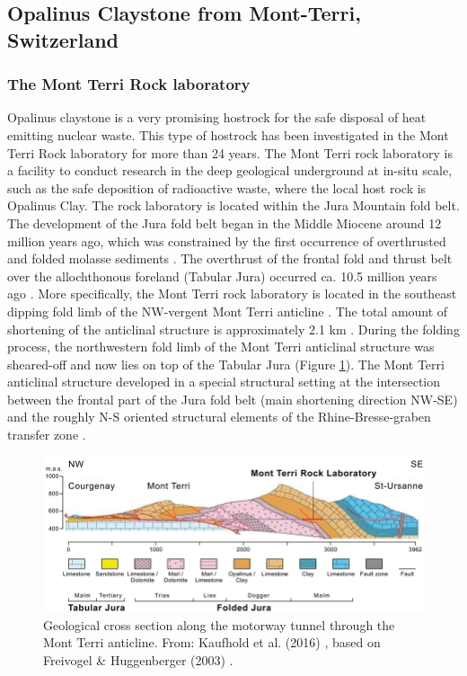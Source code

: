 \subsection{Opalinus Claystone from Mont-Terri, Switzerland}


\subsubsection{The Mont Terri Rock laboratory}\label{sec:mont_terri}

Opalinus claystone is a very promising hostrock for the safe disposal of heat emitting nuclear waste. This type of hostrock has been investigated in the Mont Terri Rock laboratory for more than 24 years. The Mont Terri rock laboratory is a facility to conduct research in the deep geological underground at in-situ scale, such as the safe deposition of radioactive waste, where the local host rock is Opalinus Clay. The rock laboratory is located within the Jura Mountain fold belt. The development of the Jura fold belt began in the Middle Miocene around 12 million years ago, which was constrained by the first occurrence of overthrusted and folded molasse sediments \cite{bolliger1993}. The overthrust of the frontal fold and thrust belt over the allochthonous foreland (Tabular Jura) occurred ca. 10.5 million years ago \cite{becker2000}. More specifically, the Mont Terri rock laboratory is located in the southeast dipping fold limb of the NW-vergent Mont Terri anticline \cite{nussbaum2011}. The total amount of shortening of the anticlinal structure is approximately 2.1 km \cite{freivogel2003}. During the folding process, the northwestern fold limb of the Mont Terri anticlinal structure was sheared-off and now lies on top of the Tabular Jura (Figure \ref{fig:bgr_mt_sideview}). The Mont Terri anticlinal structure developed in a special structural setting at the intersection between the frontal part of the Jura fold belt (main shortening direction NW-SE) and the roughly N-S oriented structural elements of the Rhine-Bresse-graben transfer zone \cite{nussbaum2011}.

\begin{figure}[!ht]
\centering
\includegraphics[width=1\textwidth]{./figures/bgr_mont_terri_side_view.png}
\caption{Geological cross section along the motorway tunnel through the Mont Terri anticline. From: Kaufhold et al. (2016) \cite{kaufhold2016}, based on Freivogel \& Huggenberger (2003) \cite{freivogel2003}.}
\label{fig:bgr_mt_sideview}
\end{figure}

